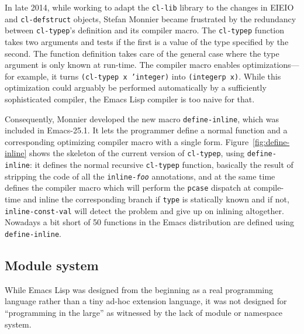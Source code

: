 \documentclass[format=acmsmall, review]{acmart}
\newcommand \Elisp {Emacs Lisp}
\begin{document}
In late 2014, while working to adapt the \texttt{cl-lib} library to the
changes in EIEIO and \texttt{cl-defstruct} objects, Stefan Monnier became
frustrated by the redundancy between \texttt{cl-typep}'s definition and its
compiler macro.
The \texttt{cl-typep} function takes two arguments and tests if the first is
a value of the type specified by the second.  The function definition takes
care of the general case where the type argument is only known at run-time.
The compiler macro enables optimizations---for example, it turns
\texttt{(cl-typep x 'integer)} into \texttt{(integerp x)}.  While this
optimization could arguably be performed automatically by a sufficiently
sophisticated compiler, the \Elisp{} compiler is too naive for that.

Consequently, Monnier developed the new macro \texttt{define-inline}, which
was included in Emacs-25.1.  It lets the programmer define a normal function
and a corresponding optimizing compiler macro with a single form.
Figure~\ref{fig:define-inline} shows the skeleton of the current version of
\texttt{cl-typep}, using \texttt{define-inline}: it defines the normal
recursive \texttt{cl-typep} function, basically the result of stripping the
code of all the \texttt{inline-\textit{foo}} annotations, and at the same
time defines the compiler macro which will perform the \texttt{pcase}
dispatch at
compile-time and inline the corresponding branch if \texttt{type} is
statically known and if not, \texttt{inline-const-val} will detect
the problem and give up on inlining altogether.  Nowadays a bit short of 50
functions in the Emacs distribution are defined using
\texttt{define-inline}.



\subsection{Module system}
\label{sec:module-system}

While \Elisp{} was designed from the beginning as a real programming
language rather than a tiny ad-hoc extension language, it was not designed
for ``programming in the large'' as witnessed by the lack of module or
namespace system.
\end{document}

